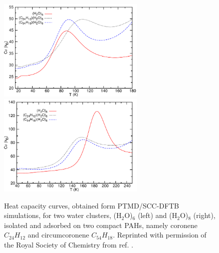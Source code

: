 \documentclass[]{interact}
\theoremstyle{plain}%
\theoremstyle{definition}
\theoremstyle{remark}
\begin{document}
		
		 \begin{figure}[!ht]
\includegraphics[width=7cm]{CapaW6PAH.pdf}\includegraphics[width=7cm]{CapaW8PAH.pdf}
\caption{Heat capacity curves, obtained form PTMD/SCC-DFTB simulations, for two water clusters, (H$_2$O)$_{6}$ (left) and  (H$_2$O)$_{8}$ (right), isolated and adsorbed on two compact PAHs, namely coronene $C_{ 24}H_{12}$ and circumcoronene $C_{ 54}H_{18}$.  Reprinted with permission of the Royal Society of Chemistry from ref. \cite{Oliveira2015}.}
\label{fig:capa_WnPAH}
\end{figure}	
		
\end{document}
